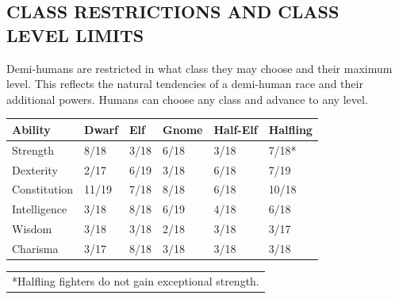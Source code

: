 \begin{multicols}{2}
\begin{minipage}{\columnwidth}
\end{minipage}

\vspace{10pt}

\section{CLASS RESTRICTIONS AND CLASS LEVEL LIMITS}

Demi-humans are restricted in what class they may choose and their maximum level.  This reflects the natural tendencies of a demi-human race and their additional powers.  Humans can choose any class and advance to any level.

\end{multicols}

\noindent
\begin{minipage}{\columnwidth}

\label{abilityscorereqs}
\noindent
\begin{tabular}{|m{}|m{}|m{}|m{}|m{}|m{}|}
\hline
Ability			& Dwarf	& Elf	& Gnome	& Half-Elf	& Halfling \\
\hline\hline
\rowcolor[gray]{.9}Strength		& 8/18	& 3/18	& 6/18	& 3/18		& 7/18* \\
Dexterity		& 2/17	& 6/19	& 3/18	& 6/18		& 7/19 \\
\rowcolor[gray]{.9}Constitution	& 11/19	& 7/18	& 8/18	& 6/18		& 10/18 \\
Intelligence	& 3/18	& 8/18	& 6/19	& 4/18		& 6/18 \\
\rowcolor[gray]{.9}Wisdom			& 3/18	& 3/18	& 2/18	& 3/18		& 3/17 \\
Charisma		& 3/17	& 8/18	& 3/18	& 3/18		& 3/18 \\
\hline
\end{tabular}
\noindent
\begin{tabular}{p{\textwidth}}
*Halfling fighters do not gain exceptional strength. \\
\end{tabular}\vspace{.5em}

\end{minipage}

